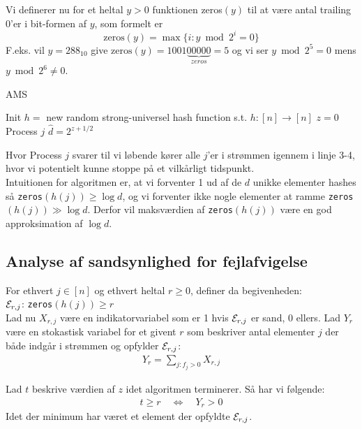 Vi definerer nu for et heltal $y > 0$ funktionen zeros$(y)$ til at være antal trailing 0'er i bit-formen af $y$, som formelt er
$$
\text{zeros}(y) = \max\{i : y \bmod 2^i = 0\}
$$
F.eks. vil $y = 288_{10}$ give $\text{zeros}(y) = 1001 \underbrace{00000}_{zeros} = 5$ og vi ser $y \bmod 2^5 = 0$ mens $y \bmod 2^6 \neq 0$.\\


\begin{algorithm}[H] \caption{AMS} \label{alg:ams}
  \nonl Init\;
  $h =$ new random strong-universel hash function s.t. $h : [n] \rightarrow [n]$\;
  $z = 0$\;
  \nonl Process $j$\;
  \Return $\hat d = 2^{z + 1/2}$
\end{algorithm}\vspace{1em}

Hvor Process $j$ svarer til vi løbende kører alle $j$'er i strømmen igennem i linje 3-4, hvor vi potentielt kunne stoppe på et vilkårligt tidspunkt.\\

Intuitionen for algoritmen er, at vi forventer 1 ud af de $d$ unikke elementer hashes så \texttt{zeros}$(h(j)) \geq \log d$, og vi forventer ikke nogle elementer at ramme \texttt{zeros}$(h(j)) \gg \log d$. Derfor vil maksværdien af \texttt{zeros}$(h(j))$ være en god approksimation af $\log d$.


\subsection{Analyse af sandsynlighed for fejlafvigelse}

For ethvert $j \in [n]$ og ethvert heltal $r \geq 0$, definer da begivenheden:\\
${\mathcal{E}}_{r,j}$: \texttt{zeros}$(h(j)) \geq r$\\

Lad nu $X_{r,j}$ være en indikatorvariabel som er 1 hvis ${\mathcal{E}}_{r,j}$ er sand, 0 ellers. Lad $Y_r$ være en stokastisk variabel for et givent $r$ som beskriver antal elementer $j$ der både indgår i strømmen og opfylder ${\mathcal{E}}_{r,j}$:
\begin{align}
  Y_r = \sum_{j: f_j > 0} X_{r,j} \label{eq:yr-def}
\end{align}

Lad $t$ beskrive værdien af $z$ idet algoritmen terminerer. Så har vi følgende:
\begin{align}
  t \geq r \quad \Longleftrightarrow \quad Y_r > 0  \label{eq:t-greater-eq-r}
\end{align}
Idet der minimum har været et element der opfyldte ${\mathcal{E}}_{r,j}$.\\

